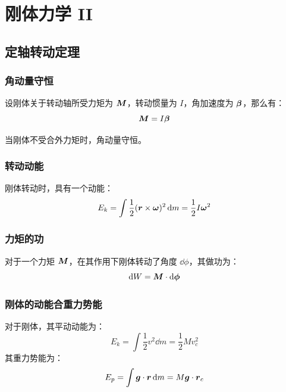 \section{刚体力学 II}

\subsection{定轴转动定理}

\subsubsection{角动量守恒}

设刚体关于转动轴所受力矩为 $\boldsymbol{M}$，转动惯量为 $I$，角加速度为 $\boldsymbol{\beta}$，那么有：
$$
\boldsymbol{M} = I \boldsymbol{\beta}
$$

当刚体不受合外力矩时，角动量守恒。

\subsubsection{转动动能}

刚体转动时，具有一个动能：
$$
E_k = \int \frac{1}{2} (\boldsymbol{r} \times \boldsymbol{\omega})^2 \dd{m} = \frac{1}{2} I \boldsymbol{\omega}^2
$$

\subsubsection{力矩的功}

对于一个力矩 $\boldsymbol{M}$，在其作用下刚体转动了角度 $\dd{\phi}$，其做功为：
$$
\dd{W} = \boldsymbol{M} \cdot \dd{\boldsymbol{\phi}}
$$

\subsubsection{刚体的动能合重力势能}

对于刚体，其平动动能为：
$$
E_k = \int \frac{1}{2} v^2 \dd{m} = \frac{1}{2} M v_c^2
$$
其重力势能为：
$$
E_p = \int \boldsymbol{g} \cdot \boldsymbol{r} \dd{m} = M \boldsymbol{g} \cdot \boldsymbol{r}_c
$$
